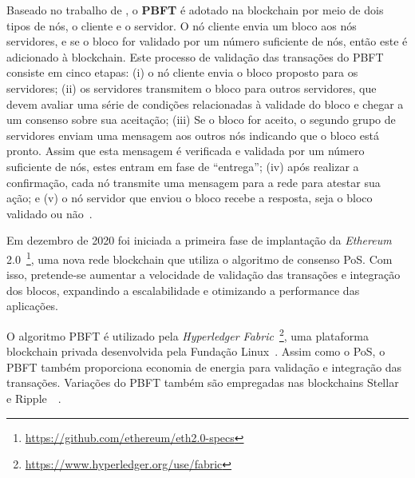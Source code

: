 Baseado no trabalho de , o \textbf{PBFT} é adotado na blockchain por meio de dois tipos de nós, o cliente e o servidor. O nó cliente envia um bloco aos nós servidores, e se o bloco for validado por um número suficiente de nós, então este é adicionado à blockchain. Este processo de validação das transações do PBFT consiste em cinco etapas: (i) o nó cliente envia o bloco proposto para os servidores; (ii) os servidores transmitem o bloco para outros servidores, que devem avaliar uma série de condições relacionadas à validade do bloco e chegar a um consenso sobre sua aceitação; (iii) Se o bloco for aceito, o segundo grupo de servidores enviam uma mensagem aos outros nós indicando que o bloco está pronto. Assim que esta mensagem é verificada e validada por um número suficiente de nós, estes entram em fase de ``entrega''; (iv) após realizar a confirmação, cada nó transmite uma mensagem para a rede para atestar sua ação; e (v) o nó servidor que enviou o bloco recebe a resposta, seja o bloco validado ou não~\cite{consenso-Bouraga2021,consenso-xiao-2020,overview-ahmed-2019,consenso-zhang2020analysis}. 


Em dezembro de 2020 foi iniciada a primeira fase de implantação da \textit{Ethereum} 2.0~\footnote{\url{https://github.com/ethereum/eth2.0-specs}}, uma nova rede blockchain que utiliza o algoritmo de consenso PoS. Com isso, pretende-se aumentar a velocidade de validação das transações e integração dos blocos, expandindo a escalabilidade e otimizando a performance das aplicações.

O algoritmo PBFT é utilizado pela \textit{Hyperledger Fabric}~\footnote{\url{https://www.hyperledger.org/use/fabric}}, uma plataforma blockchain privada desenvolvida pela Fundação Linux~\cite{overview-hyperledger2018androulaki}. Assim como o PoS, o PBFT também proporciona economia de energia para validação e integração das transações. Variações do PBFT também são empregadas nas blockchains Stellar~\cite{overview-stellar2015mazieres} e Ripple~\cite{overview-schwartz2014ripple}~\cite{overview-ahmed-2019, consenso-xiao-2020, consenso-zhang2020analysis}.
 


